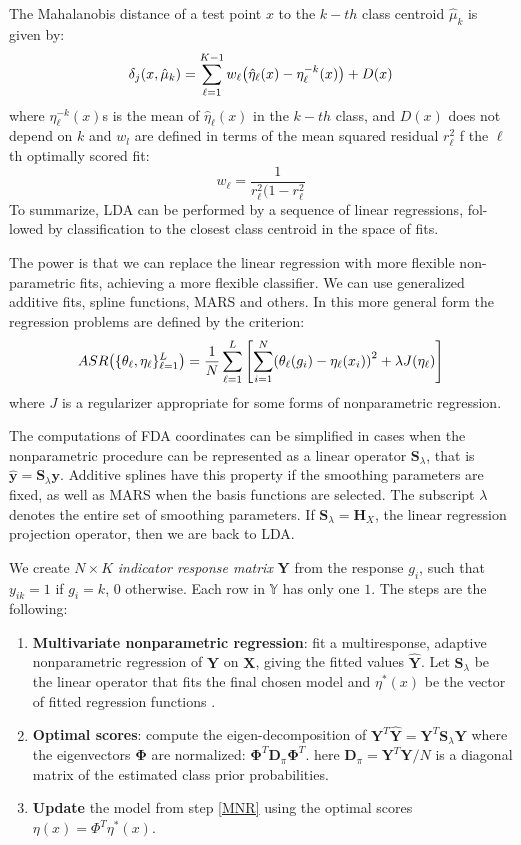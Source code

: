 \documentclass[12pt, letterpaper]{article}
\theoremstyle{definition}
\newcommand{\y}{\mathbf{y}}
\DeclarePairedDelimiter\autobracket{(}{)}
\newcommand{\br}[1]{\autobracket*{#1}}
\begin{document}
The Mahalanobis distance of a test point $x$ to the $k-th$ class centroid $\hat{\mu}_k$ is given by:
\begin{equation}
\delta_j (x, \hat{\mu}_k) = \sum_{\ell=1}^{K-1} w_\ell \br{\hat{\eta}_\ell(x) - \eta_\ell^{-k}(x) }+D(x)
\end{equation}
where $\eta_\ell^{-k}(x) $s is the mean of $\hat{\eta}_\ell(x)$ in the $k-th$ class, and $D(x)$ does not depend on $k$ and $w_l$ are defined in terms of the mean squared residual $r_\ell^2$ f the $\ell$th optimally scored fit:
\begin{equation}
w_\ell = \frac{1}{r_\ell^2(1-r_\ell^2}
\end{equation}
To summarize, LDA can be performed by a sequence of linear regressions, fol- lowed by classification to the closest class centroid in the space of fits.

The power is that we can replace the linear regression with more flexible non-parametric fits, achieving a more flexible classifier. We can use generalized additive fits, spline functions, MARS and others. In this more general form the regression problems are defined by the criterion:
\begin{equation}
ASR \br{\{\theta_\ell, \eta_\ell \}_{\ell=1}^L} = \frac{1}{N}\sum_{\ell=1}^L\left[\sum_{i=1}^N \br{\theta_\ell(g_i) - \eta_\ell(x_i)}^2 + \lambda J(\eta_\ell)\right]
\end{equation}
where $J$ is a regularizer appropriate for some forms of nonparametric regression.

The computations of FDA coordinates can be simplified in cases when the nonparametric procedure can be represented as a linear operator $\mathbf{S}_\lambda$, that is $\hat{\y} =\mathbf{S}_\lambda \y$. Additive splines have this property if the smoothing parameters are fixed, as well as MARS when the basis functions are selected. The subscript $\lambda$ denotes the entire set of smoothing parameters. If $\mathbf{S}_\lambda = \mathbf{H}_X$, the linear regression projection operator, then we are back to LDA.

We create $N \times K$ \textit{indicator response matrix} \textbf{Y} from the response $g_i$, such that $y_{ik} = 1$ if $g_i =k$, $0$ otherwise. Each row in $\mathbb{Y}$ has only one $1$.
The steps are the following:
\begin{enumerate}
\item \textbf{Multivariate nonparametric regression}: fit a multiresponse, adaptive nonparametric regression of $\mathbf{Y}$ on $\mathbf{X}$, giving the fitted values $\mathbf{\hat{Y}}$. Let $\mathbf{S}_\lambda$ be the linear operator that fits the final chosen model and $\eta^*(x)$ be the vector of fitted regression functions \label{MNR}.
\item \textbf{Optimal scores}: compute the eigen-decomposition of $\mathbf{Y}^T\mathbf{\hat{Y}}=\mathbf{Y}^T\mathbf{S}_\lambda \mathbf{Y}$ where the eigenvectors $\mathbf{\Phi}$ are normalized: $\mathbf{\Phi}^T\mathbf{D}_\pi\mathbf{\Phi}^T$. here $\mathbf{D}_\pi = \mathbf{Y}^T\mathbf{Y}/N$ is a diagonal matrix of the estimated class prior probabilities.
\item \textbf{Update} the model from step \ref{MNR} using the optimal scores $\eta(x) = \Phi^T\eta^*(x)$.
\end{enumerate}  
\end{document}
